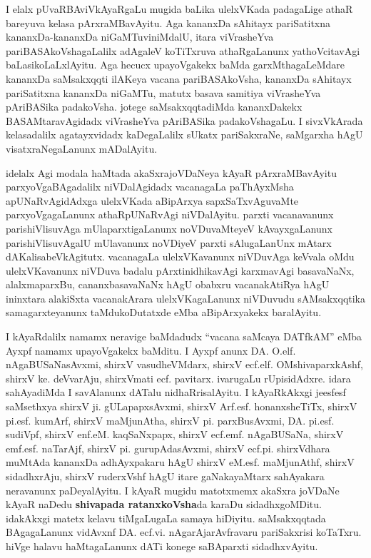 \medskip

I elalx pUvaRBAviVkAyaRgaLu mugida baLika ulelxVKada padagaLige athaR bareyuva kelasa pArxraMBavAyitu. Aga kananxDa sAhitayx pariSatitxna kananxDa-kananxDa niGaMTuviniMdalU, itara viVrasheYva pariBASAkoVshagaLalilx adAgaleV koTiTxruva athaRgaLanunx yathoVcitavAgi baLasikoLaLxlAyitu. Aga hecucx upayoVgakekx baMda garxMthagaLeMdare kananxDa saMsakxqqti ilAKeya vacana pariBASA\-koVsha, kananxDa sAhitayx pariSatitxna kananxDa niGaMTu, matutx basava samitiya viVrasheYva pAri\-BASika padakoVsha. jotege saMsakxqqtadiMda kananxDakekx BASAMtaravAgidadx viVrasheYva pAriBASika padakoVshagaLu. I sivxVkArada kelasadalilx agatayxvidadx kaDegaLalilx sUkatx pariSakxraNe, saMgarxha hAgU visatxraNegaLanunx mADalAyitu.

\medskip

idelalx Agi modala haMtada akaSxrajoVDaNeya kAyaR pArxraMBavAyitu parxyoVgaBAgadalilx niVDalAgidadx vacanagaLa paThAyxMsha apUNaRvAgidAdxga ulelxVKada aBipArxya sapxSaTxvAguvaMte parxyoVgagaLanunx athaRpUNaRvAgi niVDalAyitu. parxti vacanavanunx parishiVlisuvAga mUlaparxtigaLanunx noVDuvaMteyeV kAvayxgaLanunx parishiVlisuvAgalU mUlavanunx noVDiyeV parxti sAlugaLanUnx mAtarx dAKalisabeVkAgitutx. vacanagaLa ulelxVKavanunx niVDuvAga keVvala oMdu ulelxVKavanunx niVDuva badalu  pArxtinidhikavAgi karxmavAgi basavaNaNx, alalxmaparxBu, cananxbasavaNaNx hAgU obabxru vacanakAtiRya hAgU ininxtara alakiSxta vacanakArara ulelxVKagaLanunx niVDuvudu sAMsakxqqtika samagarxteyanunx taMdukoDutatxde eMba aBipArxyakekx baralAyitu.

\medskip

I kAyaRdalilx namamx neravige baMdadudx ``vacana saMcaya DATfkAM'' eMba  Ayxpf namamx upayoVgakekx baMditu. I Ayxpf anunx DA. O.elf. nAgaBUSaNa\-sAvxmi, shirxV vasudheVMdarx, shirxV ecf.elf. OMshivaparxkAshf, shirxV ke. deVvarAju, shirxVmati ecf. pavitarx.  ivaru\-gaLu rUpisidAdxre.  idara sahAyadiMda I savAlanunx dATalu nidhaRrisalAyitu. I kAyaRkAkxgi jeesfesf saMsethxya shirxV ji. gULapapxsAvxmi, shirxV Arf.esf. honanxsheTiTx, shirxV pi.esf. kumArf,  shirxV maMjunAtha, shirxV pi. parxBusAvxmi, DA. pi.esf. sudiVpf, shirxV enf.eM. kaqSaNxpapx, shirxV ecf.emf. nAgaBUSaNa, shirxV emf.esf. naTarAjf, shirxV pi. gurupAdasAvxmi, shirxV ecf.pi. shirxVdhara muMtAda kananxDa adhAyxpakaru hAgU shirxV eM.esf. maMjunAthf, shirxV sidadhxrAju, shirxV ruderxVshf hAgU itare gaNakayaMtarx sahAyakara neravanunx paDeyalAyitu. I kAyaR mugidu matotxmemx akaSxra joVDaNe kAyaR naDedu \textbf{shivapada ratanxkoVsha}da karaDu sidadhxgoMDitu. idakAkxgi matetx kelavu tiMgaLugaLa samaya hiDiyitu. saMsakxqqtada BAgagaLanunx vidAvxnf DA. ecf.vi. nAgarAjarAvfravaru pariSakxrisi koTaTxru. hiVge halavu haMtagaLanunx dATi konege saBAparxti sidadhxvAyitu.

